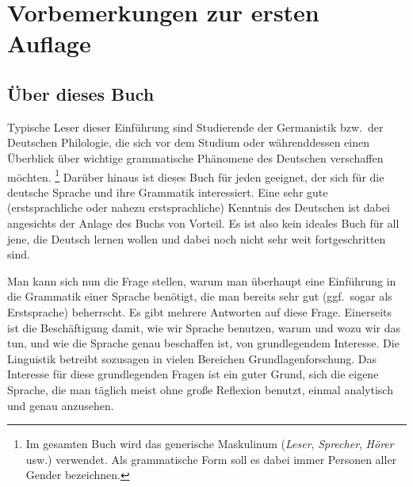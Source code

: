 \Phantom
{}

\chapter*{Vorbemerkungen zur ersten Auflage}

\section*{Über dieses Buch}

Typische Leser dieser Einführung sind Studierende der Germanistik bzw.\ der Deutschen Philologie, die sich vor dem Studium oder währenddessen einen Überblick über wichtige grammatische Phänomene des Deutschen verschaffen möchten.%
\footnote{Im gesamten Buch wird das generische Maskulinum (\textit{Leser}, \textit{Sprecher}, \textit{Hörer} usw.) verwendet.
Als grammatische Form soll es dabei immer Personen aller Gender bezeichnen.}
Darüber hinaus ist dieses Buch für jeden geeignet, der sich für die deutsche Sprache und ihre Grammatik interessiert.
Eine sehr gute (erstsprachliche oder nahezu erstsprachliche) Kenntnis des Deutschen ist dabei angesichts der Anlage des Buchs von Vorteil.
Es ist also kein ideales Buch für all jene, die Deutsch lernen wollen und dabei noch nicht sehr weit fortgeschritten sind.

Man kann sich nun die Frage stellen, warum man überhaupt eine Einführung in die Grammatik einer Sprache benötigt, die man bereits sehr gut (ggf.\ sogar als Erstsprache) beherrscht.
Es gibt mehrere Antworten auf diese Frage.
Einerseits ist die Beschäftigung damit, wie wir Sprache benutzen, warum und wozu wir das tun, und wie die Sprache genau beschaffen ist, von grundlegendem Interesse.
Die Linguistik betreibt sozusagen in vielen Bereichen Grundlagenforschung.
Das Interesse für diese grundlegenden Fragen ist ein guter Grund, sich die eigene Sprache, die man täglich meist ohne große Reflexion benutzt, einmal analytisch und genau anzusehen.

